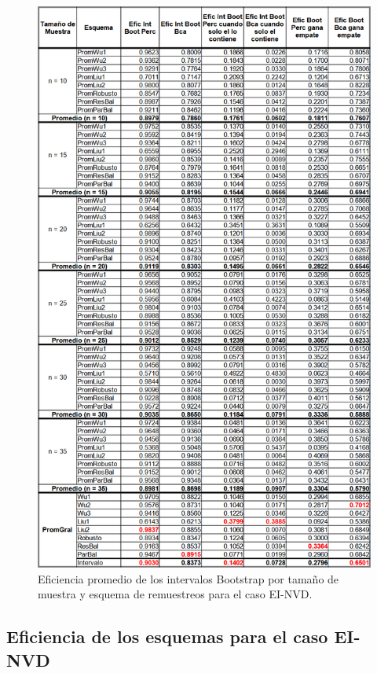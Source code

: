 \begin{figure}[ht] 
	\centering 
	\includegraphics[width=0.75\linewidth]{img/EI_NVD_Efic_Boots.png} 
	\caption{Eficiencia promedio de los intervalos Bootstrap por tamaño de muestra y esquema de remuestreos para el caso EI-NVD.} 
	\label{fig:EI_NVD_Boots}
\end{figure}

\subsection{Eficiencia de los esquemas para el caso EI-NVD}

